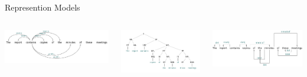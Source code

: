 \documentclass[10pt,=table]{beamer}
\begin{document}
\begin{frame}{Represention Models}
	\begin{columns}
		\begin{minipage}[c][0.3\textheight][c]{\linewidth}
		 \centering
		 \includegraphics[width=1\linewidth]{img/tree/lexical_tree.pdf}
		\end{minipage}
		\begin{minipage}[c][0.3\textheight][c]{\linewidth}
		 \centering
		\includegraphics[width=1\linewidth]{img/tree/tree.pdf}
		\end{minipage}
		\begin{minipage}[c][0.3\textheight][c]{\linewidth}
		\centering
		\includegraphics[width=1\linewidth]{img/tree/dep_tree.pdf}
		\end{minipage}
		\begin{minipage}[c][0.3\textheight][c]{\linewidth}

\end{minipage}
\end{columns}
\end{frame}
\end{document}
